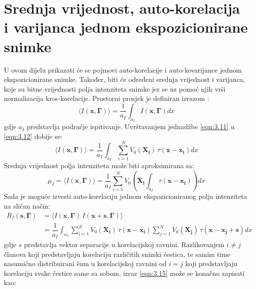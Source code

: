 \section{Srednja vrijednost, auto-korelacija i varijanca jednom ekspozicionirane snimke}
U ovom dijelu prikazati će se pojmovi auto-korelacije i auto-kovarijance jednom ekspozicionirane snimke. Također, biti će određeni srednja vrijednost i varijanca, koje su bitne vrijednosti polja intenziteta snimke jer se uz pomoć njih vrši normalizacija kros-korelacije. Prostorni prosjek je definiran izrazom \cite{raffel2018_book}:
\begin{equation}
	\langle I(\boldsymbol{x}, \boldsymbol{\Gamma})\rangle =\dfrac{1}{a_{I}}\int_{a_{I}}I(\boldsymbol{x}, \boldsymbol{\Gamma})dx
	\label{eqn:3.12}
\end{equation}
gdje $a_{I}$ predstavlja područje ispitivanje. Uvrštavanjem jednadžbe \ref{eqn:3.11} u \ref{eqn:3.12} dobije se:
\begin{equation}
	\langle I(\boldsymbol{x}, \boldsymbol{\Gamma})\rangle =\dfrac{1}{a_{I}}\int_{a_{I}}\sum_{i=1}^{N}V_{0}(\boldsymbol{X_{i}})\, \tau (\boldsymbol{x}-\boldsymbol{x_{i}})dx
	\label{eqn:3.13}
\end{equation}
Srednja vrijednost polja intenziteta može biti aproksimirana sa:
\begin{equation}
	\mu_{I}=\langle I(\boldsymbol{x}, \boldsymbol{\Gamma})\rangle =\dfrac{1}{a_{I}}\sum_{i=1}^{N}V_{0}(\boldsymbol{X_{i}}\int_{a_{I}}\tau (\boldsymbol{x}-\boldsymbol{x_{i}}))dx
	\label{eqn:3.14}
\end{equation}
Sada je moguće izvesti auto-korelaciju jednom ekspozicioniranog polja intenziteta na sličan način:
\begin{equation}
	\begin{split}
		R_{I}(\boldsymbol{s}, \boldsymbol{\Gamma}) &= \langle I(\boldsymbol{x}, \boldsymbol{\Gamma})\, I(\boldsymbol{x}+\boldsymbol{s}, \boldsymbol{\Gamma})\rangle\\
		 &= \dfrac{1}{a_{I}}\int_{a_{I}}\sum_{i=1}^{N}V_{0}(\boldsymbol{X_{i}})\, \tau (\boldsymbol{x}-\boldsymbol{x_{i}})\sum_{j=1}^{N}V_{0}(\boldsymbol{X_{j}})\, \tau (\boldsymbol{x}-\boldsymbol{x_{j}}+\boldsymbol{s})dx
		 \label{eqn:3.15}
	\end{split}
\end{equation}
gdje $s$ predstavlja vektor separacije u korelacijskoj ravnini. Razlikovanjem $i\neq j$ članova koji predstavljaju korelaciju različitih snimki čestica, te samim time nasumično distribuirani šum u korelacijskoj ravnini od $i=j$ koji predstavljaju korelaciju svake čestice same sa sobom, izraz \ref{eqn:3.15} može se konačno zapisati kao:

